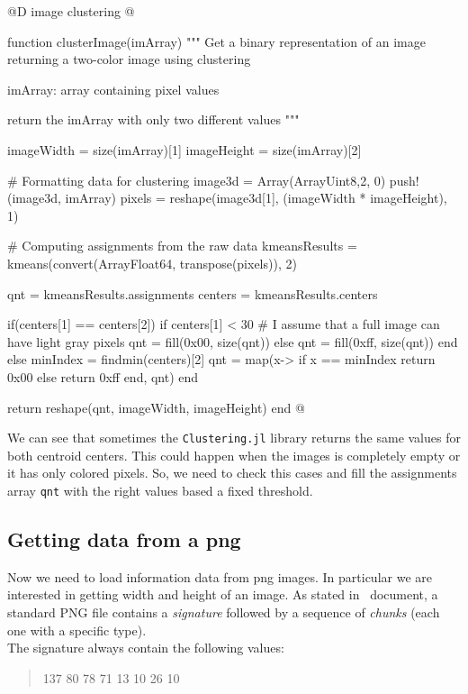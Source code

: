 \documentclass[11pt,oneside]{article}	%
\begin{document}
@D image clustering
@{function clusterImage(imArray)
  """
  Get a binary representation of an image returning
  a two-color image using clustering
  
  imArray: array containing pixel values
  
  return the imArray with only two different values
  """
  
  imageWidth = size(imArray)[1]
  imageHeight = size(imArray)[2]

  # Formatting data for clustering
  image3d = Array(Array{Uint8,2}, 0)
  push!(image3d, imArray)
  pixels = reshape(image3d[1], (imageWidth * imageHeight), 1)
  
  # Computing assignments from the raw data
  kmeansResults = kmeans(convert(Array{Float64}, transpose(pixels)), 2)
  
  qnt = kmeansResults.assignments
  centers = kmeansResults.centers
  
  if(centers[1] == centers[2])
    if centers[1] < 30 # I assume that a full image can have light gray pixels
      qnt = fill(0x00, size(qnt))
    else
      qnt = fill(0xff, size(qnt))
    end
  else
    minIndex = findmin(centers)[2]
    qnt = map(x-> if x == minIndex return 0x00 else return 0xff end, qnt)
  end
  
  return reshape(qnt, imageWidth, imageHeight)  
end @}


We can see that sometimes the \texttt{Clustering.jl} library returns the same values for both centroid centers. This could happen when the images is completely empty or it has only colored pixels. So, we need to check this cases and fill the assignments array \texttt{qnt} with the right values based a fixed threshold.


\subsection{Getting data from a png}\label{sec:getData}

Now we need to load information data from png images. In particular we are interested in getting width and height of an image. As stated in~\cite{W3CPNG} document, a standard PNG file contains a \textit{signature} followed by a sequence of \textit{chunks} (each one with a specific type).\\

The signature always contain the following values:

\begin{quote}
 137 80 78 71 13 10 26 10
\end{quote}
   
\end{document}
